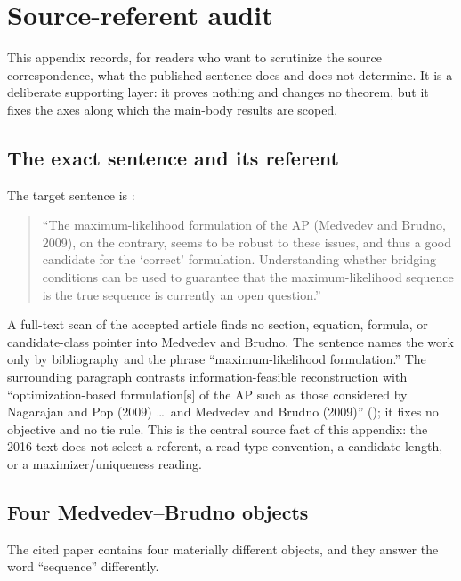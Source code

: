 \section{Source-referent audit}
\label{app:audit}

This appendix records, for readers who want to scrutinize the source
correspondence, what the published sentence does and does not determine. It is
a deliberate supporting layer: it proves nothing and changes no theorem, but
it fixes the axes along which the main-body results are scoped.

\subsection{The exact sentence and its referent}

The target sentence is \cite[Discussion, p.~i501]{shomorony2016}:

\begin{quote}
``The maximum-likelihood formulation of the AP (Medvedev and Brudno, 2009), on
the contrary, seems to be robust to these issues, and thus a good candidate for
the `correct' formulation. Understanding whether bridging conditions can be used
to guarantee that the maximum-likelihood sequence is the true sequence is
currently an open question.''
\end{quote}

A full-text scan of the accepted article finds no section, equation, formula, or
candidate-class pointer into Medvedev and Brudno. The sentence names the work
only by bibliography and the phrase ``maximum-likelihood formulation.'' The
surrounding paragraph contrasts information-feasible reconstruction with
``optimization-based formulation[s] of the AP such as those considered by
Nagarajan and Pop (2009) \dots\ and Medvedev and Brudno (2009)''
(\cite{nagarajan2009,medvedev2009}); it fixes no objective and no tie rule. This
is the central source fact of this appendix: \srcfact{} the 2016 text does not
select a referent, a read-type convention, a candidate length, or a
maximizer/uniqueness reading.

\subsection{Four Medvedev--Brudno objects}

The cited paper contains four materially different objects, and they answer the
word ``sequence'' differently.

